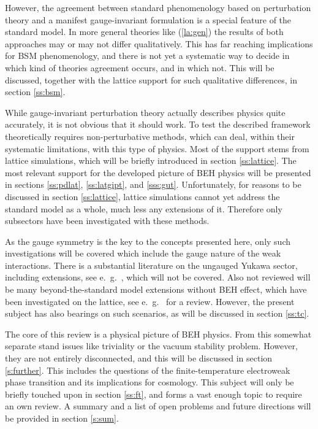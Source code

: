 \documentclass[final,twoside,12pt]{article}
\newcommand*{\pref}[1]{(\ref{#1})}
\newcommand*{\1}{1\!\!\!\bot}
\begin{document}
However, the agreement between standard phenomenology based on perturbation theory and a manifest gauge-invariant formulation is a special feature of the standard model. In more general theories like \pref{la:gen} the results of both approaches may or may not differ qualitatively. This has far reaching implications for BSM phenomenology, and there is not yet a systematic way to decide in which kind of theories agreement occurs, and in which not. This will be discussed, together with the lattice support for such qualitative differences, in section \ref{ss:bsm}.

While gauge-invariant perturbation theory actually describes physics quite accurately, it is not obvious that it should work. To test the described framework theoretically requires non-perturbative methods, which can deal, within their systematic limitations, with this type of physics. Most of the support stems from lattice simulations, which will be briefly introduced in section \ref{ss:lattice}. The most relevant support for the developed picture of BEH physics will be presented in sections \ref{ss:pdlat}, \ref{ss:latgipt}, and \ref{sss:gut}. Unfortunately, for reasons to be discussed in section \ref{ss:lattice}, lattice simulations cannot yet address the standard model as a whole, much less any extensions of it. Therefore only subsectors have been investigated with these methods.

As the gauge symmetry is the key to the concepts presented here, only such investigations will be covered which include the gauge nature of the weak interactions. There is a substantial literature on the ungauged Yukawa sector, including extensions, see e.\ g.\ \cite{Fodor:2007fn,Gerhold:2007gx,Gerhold:2010bh,Gerhold:2011mx,Chu:2015nha,Bulava:2012rb,Gies:2014xha,Capitani:2019syo}, which will not be covered. Also not reviewed will be many beyond-the-standard model extensions without BEH effect, which have been investigated on the lattice, see e.\ g.\ \cite{DeGrand:2015zxa} for a review. However, the present subject has also bearings on such scenarios, as will be discussed in section \ref{ss:tc}.

The core of this review is a physical picture of BEH physics. From this somewhat separate stand issues like triviality or the vacuum stability problem. However, they are not entirely disconnected, and this will be discussed in section \ref{s:further}. This includes the questions of the finite-temperature electroweak phase transition and its implications for cosmology. This subject will only be briefly touched upon in section \ref{ss:ft}, and forms a vast enough topic to require an own review. A summary and a list of open problems and future directions will be provided in section \ref{s:sum}.
\end{document}
